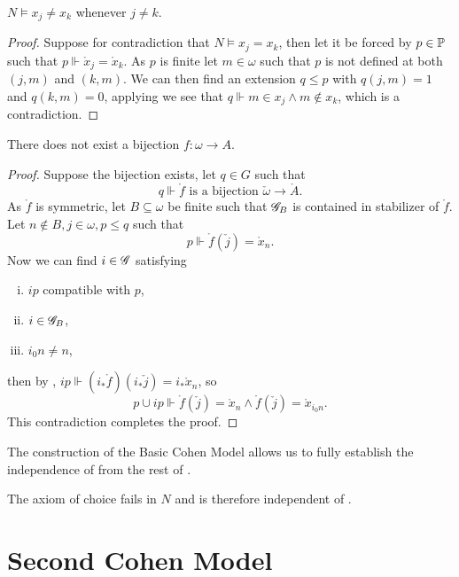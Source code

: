 \begin{lemma}
    \(N\models x_j\ne x_k\) whenever \(j\ne k\).
\end{lemma}
\begin{proof}
    Suppose for contradiction that \(N\models x_j = x_k\),
    then let it be forced by \(p\in \P\) such that \(p\Vdash \mathring{x}_j = \mathring{x}_k\).
    As \(p\) is finite let \(m\in\omega\) such that \(p\) is not defined at both \((j,m)\) and \((k,m)\).
    We can then find an extension \(q\leq p\) with \(q(j,m) = 1\) and \(q(k,m) = 0\),
    applying 
    we see that \(q\Vdash m\in x_j \land m\notin x_k\), which is a contradiction.
\end{proof}

\begin{lemma}
    There does not exist a bijection \(f:\omega\to A\).
\end{lemma}
\begin{proof}
Suppose the bijection exists, let \(q \in G\) such that \[q\Vdash \mathring{f} \text{ is a bijection } \check{\omega}\to\mathring{A}. \]
As \(\mathring{f}\) is symmetric, let \(B\subseteq \omega\) be finite such that \(\G_B\) is contained in stabilizer of \(\mathring{f}\).
Let \(n\notin B, j\in\omega, p\leq q\) such that \[p\Vdash \mathring{f}(\check{j}) = \mathring{x}_n.\]
Now we can find \(i\in\G\) satisfying
\begin{enumerate}[i.]
    \item \(i p\) compatible with \(p\),
    \item \(i \in \G_B\),
    \item \(i_0 n\ne n\),
\end{enumerate}
then by , \(i p \Vdash (i_* \mathring{f})(i_* \check{j}) = i_* \mathring{x}_{n}\), so
\[p \cup i p \Vdash \mathring{f}(\check{j}) = \mathring{x}_n \land \mathring{f}(\check{j}) = \mathring{x}_{i_0 n}. \]
This contradiction completes the proof.
\end{proof}

The construction of the Basic Cohen Model allows us to fully establish the independence of  from the rest of \ZF.
\begin{theorem}
    The axiom of choice fails in \(N\) and is therefore independent of \ZF.
\end{theorem}




\section{Second Cohen Model}

